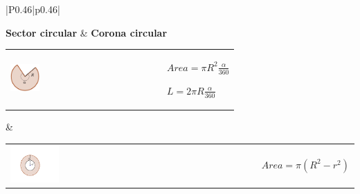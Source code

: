 \begin{center}
\begin{tabular}{|P{0.46\textwidth}|p{0.46\textwidth}|}
		
			 \textbf{Sector circular} &   \textbf{Corona circular} \\ \hline
		\begin{tabular}{m{}m{}}
			\begin{center} \includegraphics[width=0.2\textwidth]{img-09/sector} \end{center} &  \begin{center} 	$Area = \pi R^2 \frac{\alpha}{360}$ \par  $L = 2 \pi R \frac{\alpha}{360}$    \end{center}
		\end{tabular}
		& 
		\begin{tabular}{m{} m{}}
			\centering \includegraphics[width=0.2\textwidth]{img-09/corona} &   \begin{center} $Area = \pi (R^2-r^2)$ \end{center}
		\end{tabular}
		\\ \hline
	 
		  
	\end{tabular}
\end{center}